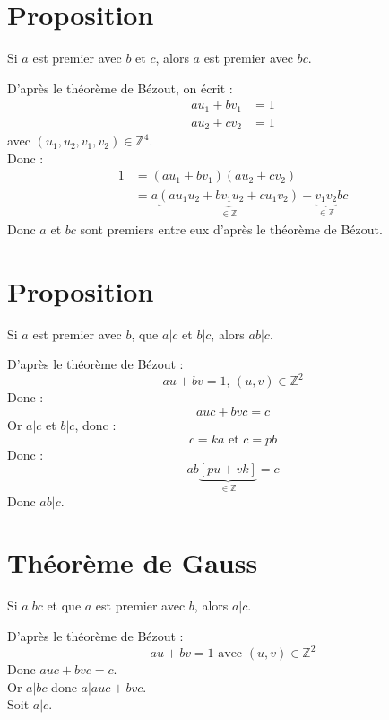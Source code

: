 \documentclass[../main.tex]{subfiles}
\begin{document}
\section{Proposition}
\begin{tcolorbox}[title=Propostion 12.28, title filled=false, colframe=lightblue, colback=lightblue!10!white]
    Si $a$ est premier avec $b$ et $c$, alors $a$ est premier avec $bc$.
\end{tcolorbox}
D'après le théorème de Bézout, on écrit : 
\begin{align*}
    au_1 + bv_1 &= 1 \\
    au_2 + cv_2 &= 1
\end{align*}
avec $(u_1, u_2, v_1, v_2) \in \mathbb{Z}^4$. \\
Donc :
\begin{align*}
    1 &= (au_1 + bv_1)(au_2 + cv_2) \\
    &= a \underbrace{(au_1u_2 + bv_1u_2 + cu_1v_2)}_{\in \mathbb{Z}} + \underbrace{v_1v_2}_{\in \mathbb{Z}} bc
\end{align*}
Donc $a$ et $bc$ sont premiers entre eux d'après le théorème de Bézout.

\section{Proposition}
\begin{tcolorbox}[title=Propostion 12.29, title filled=false, colframe=lightblue, colback=lightblue!10!white]
    Si $a$ est premier avec $b$, que $a|c$ et $b|c$, alors $ab|c$.
\end{tcolorbox}
D'après le théorème de Bézout :
$$au + bv = 1 \text{, } (u,v) \in \mathbb{Z}^2$$
Donc : 
$$auc + bvc = c$$
Or $a|c$ et $b|c$, donc : \\
$$c = ka \text{ et } c = pb$$
Donc :
$$ab \underbrace{[pu + vk]}_{\in \mathbb{Z}} = c$$
Donc $ab|c$.

\section{Théorème de Gauss}
\begin{tcolorbox}[title=Théorème 12.30, title filled=false, colframe=orange, colback=orange!10!white]
    Si $a|bc$ et que $a$ est premier avec $b$, alors $a|c$.
\end{tcolorbox}
D'après le théorème de Bézout : 
$$au + bv = 1 \text{ avec } (u,v) \in \mathbb{Z}^2$$
Donc $auc + bvc = c$. \\
Or $a|bc$ donc $a|auc + bvc$. \\
Soit $a|c$.
\end{document}
